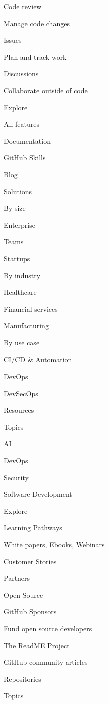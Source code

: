 \documentclass[
  letterpaper,
]{book}
\begin{document}
Code review

Manage code changes

Issues

Plan and track work

Discussions

Collaborate outside of code

\label{product-explore-heading}{Explore}

All features

Documentation

GitHub Skills

Blog

Solutions

\label{solutions-by-size-heading}{By size}

Enterprise

Teams

Startups

\label{solutions-by-industry-heading}{By industry}

Healthcare

Financial services

Manufacturing

\label{solutions-by-use-case-heading}{By use case}

CI/CD \& Automation

DevOps

DevSecOps

Resources

\label{resources-topics-heading}{Topics}

AI

DevOps

Security

Software Development

\label{resources-explore-heading}{Explore}

Learning Pathways

White papers, Ebooks, Webinars

Customer Stories

Partners

Open Source

GitHub Sponsors

Fund open source developers

The ReadME Project

GitHub community articles

\label{open-source-repositories-heading}{Repositories}

Topics
\end{document}
